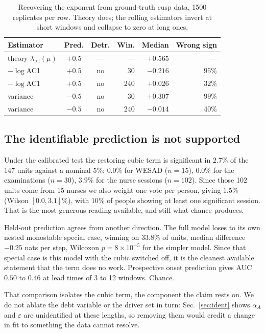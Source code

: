 \documentclass[conference]{IEEEtran}
\begin{document}
\begin{table}[tb]
\caption{Recovering the exponent from ground-truth cusp data, 1500 replicates
per row. Theory does; the rolling estimators invert at short windows and
collapse to zero at long ones.}
\label{tab:ewsval}
\centering
\begin{tabular}{@{}lccrrr@{}}
\toprule
Estimator & Pred. & Detr. & Win. & Median & Wrong sign \\
\midrule
theory $\lambda_{\text{rel}}(\mu)$ & $+0.5$ & --- & --- & $\mathbf{+0.565}$ & --- \\
\midrule
$-\log$AC1 & $+0.5$ & no & 30 & $-0.216$ & $95\%$ \\
$-\log$AC1 & $+0.5$ & no & 240 & $+0.026$ & $32\%$ \\
variance & $-0.5$ & no & 30 & $+0.307$ & $99\%$ \\
variance & $-0.5$ & no & 240 & $-0.014$ & $40\%$ \\
\bottomrule
\end{tabular}
\end{table}

\subsection{The identifiable prediction is not supported}
Under the calibrated test the restoring cubic term is significant in $2.7\%$ of
the 147 units against a nominal $5\%$: $0.0\%$ for WESAD ($n=15$), $0.0\%$ for
the examinations ($n=30$), $3.9\%$ for the nurse sessions ($n=102$). Since those 102 units come from 15 nurses we also weight one vote per person,
giving $1.5\%$ (Wilson $[0.0,3.1]\%$), with $10\%$ of people showing at least
one significant session. That is the most generous reading available, and still
what chance produces.

Held-out prediction agrees from another direction. The full model loses to its
own nested monostable special case, winning on $33.8\%$ of units, median
difference $-0.25$ nats per step, Wilcoxon $p=8\times10^{-5}$ for the simpler
model. Since that special case is this model with the cubic switched off, it is
the cleanest available statement that the term does no work. Prospective onset
prediction gives AUC $0.50$ to $0.46$ at lead times of 3 to 12 windows.
Chance.

That comparison isolates the cubic term, the component the claim rests on. We
do not ablate the debt variable or the driver set in turn: Sec.~\ref{sec:ident}
shows $\alpha_A$ and $\varepsilon$ are unidentified at these lengths, so
removing them would credit a change in fit to something the data cannot
resolve.
\end{document}
